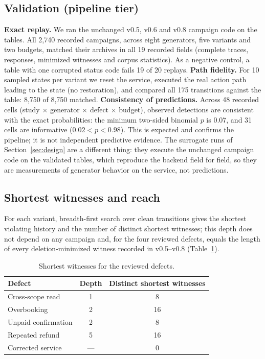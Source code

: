 \documentclass[conference]{IEEEtran}
\begin{document}
\subsection{Validation (pipeline tier)}
\textbf{Exact replay.} We ran the unchanged v0.5, v0.6 and v0.8 campaign code on the
tables. All 2{,}740 recorded campaigns, across eight generators, five variants and two
budgets, matched their archives in all 19 recorded fields (complete traces, responses,
minimized witnesses and corpus statistics). As a negative control, a table with one
corrupted status code fails 19 of 20 replays. \textbf{Path fidelity.} For 10 sampled
states per variant we reset the service, executed the real action path leading to the
state (no restoration), and compared all 175 transitions against the table: 8{,}750 of
8{,}750 matched. \textbf{Consistency of predictions.} Across 48 recorded cells (study
$\times$ generator $\times$ defect $\times$ budget), observed detections are consistent
with the exact probabilities: the minimum two-sided binomial $p$ is 0.07, and 31 cells are
informative ($0.02<p<0.98$). This is expected and confirms the pipeline; it is not
independent predictive evidence. The surrogate runs of Section~\ref{sec:design} are a
different thing: they execute the unchanged campaign code on the validated tables, which
reproduce the backend field for field, so they are measurements of generator behavior on
the service, not predictions.

\subsection{Shortest witnesses and reach}
For each variant, breadth-first search over clean transitions gives the shortest violating
history and the number of distinct shortest witnesses; this depth does not depend on any
campaign and, for the four reviewed defects, equals the length of every deletion-minimized
witness recorded in v0.5--v0.8 (Table~\ref{tab:depth}).

\begin{table}[t]
\caption{Shortest witnesses for the reviewed defects.}
\label{tab:depth}
\centering
\footnotesize
\begin{tabular}{@{}lcc@{}}
\toprule
Defect & Depth & Distinct shortest witnesses \\
\midrule
Cross-scope read & 1 & 8 \\
Overbooking & 2 & 16 \\
Unpaid confirmation & 2 & 8 \\
Repeated refund & 5 & 16 \\
Corrected service & --- & 0 \\
\bottomrule
\end{tabular}
\end{table}
\end{document}
